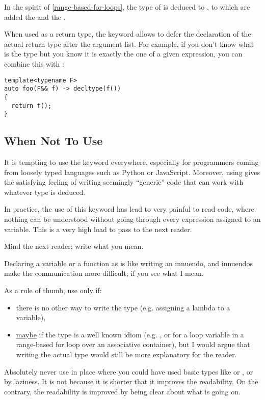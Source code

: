 In the spirit of \ref{range-based-for-loops}, the type of  is
deduced to , to which are added the 
and the \code{\&}.

When used as a return type, the  keyword allows to defer
the declaration of the actual return type after the argument list. For
example, if you don't know what is the type but you know it is exactly
the one of a given expression, you can combine this with
:

\begin{lstlisting}
template<typename F>
auto foo(F&& f) -> decltype(f())
{
  return f();
}
\end{lstlisting}

\subsection{When Not To Use }

It is tempting to use the  keyword everywhere, especially
for programmers coming from loosely typed languages such as Python or
JavaScript. Moreover, using  gives the satisfying feeling
of writing seemingly ``generic'' code that can work with whatever type
is deduced.

In practice, the use of this keyword has lead to very painful to read
code, where nothing can be understood without going through every
expression assigned to an  variable. This is a very high
load to pass to the next reader.

\begin{guideline}
Mind the next reader; write what you mean.
  
Declaring a variable or a function as  is like writing an
innuendo, and innuendos make the communication more difficult; if you
see what I mean.

As a rule of thumb, use  only if:
\begin{itemize}
\item there is no other way to write the type (e.g. assigning a
  lambda to a variable),
\item \underline{maybe} if the type is a well known idiom (e.g. , or for a loop variable in a range-based for
  loop over an associative container), but I would argue that writing
  the actual type would still be more explanatory for the reader.
\end{itemize}

Absolutely never use  in place where you could have used
basic types like  or , or by laziness. It is not
because it is shorter that it improves the readability. On the
contrary, the readability is improved by being clear about what is
going on.
\end{guideline}
